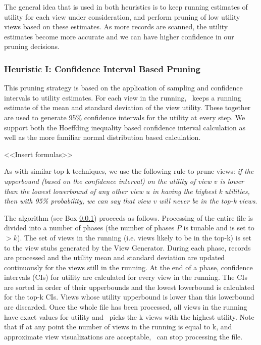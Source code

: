 The general idea that is used in both heuristics is to keep running estimates of
utility for each view under consideration, and perform pruning of low utility
views based on these estimates. 
As more records are scanned, the utility estimates become more accurate and we
can have higher confidence in our pruning decisions.

\subsubsection{Heuristic I: Confidence Interval Based Pruning}
This pruning strategy is based on the application of sampling and confidence
intervals to utility estimates. 
For each view in the running, \SeeDB\ keeps a
running estimate of the mean and standard deviation of the view utility. 
These
together are used to generate 95\% confidence intervals for the utility at every
step. 
We support both the Hoeffding inequality based confidence interval calculation
as well as the more familiar normal distribution based calculation.

<<Insert formulas>>

As with similar top-k techniques, we use the following rule
to prune views: {\it if the upperbound (based on the confidence interval) on the
utility of view $v$ is lower than the lowest lowerbound of any other view $u$
in having the highest k utilities, then with 95\% probability, we can say
that view $v$ will never be in the top-k views}.

The algorithm (see Box \ref{}) proceeds as follows. 
Processing of the entire
file is divided into a number of phases (the number of phases $P$ is tunable
and is set to $>$$k$). 
The set of views in the running (i.e. views likely to be in the top-k) is set to
the view stubs generated by the View Generator.
During each phase, records are
processed and the utility mean and standard deviation are updated
continuously for the views still in the running.
At the end of a phase, confidence intervals (CIs) for utility are calculated for
every view in the running. 
The CIs are sorted in order of their upperbounds and the lowest lowerbound is
calculated for the top-k CIs. 
Views whose utility upperbound is lower than this lowerbound are discarded.
Once the whole file has been processed, all views in the running have
exact values for utility and \SeeDB\ picks the k views with the highest utility.
Note that if at any point the number of views in the running is equal to k, and
approximate view visualizations are acceptable, \SeeDB\ can stop processing the
file.

